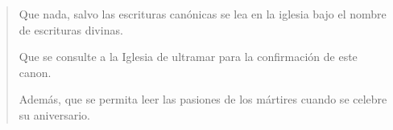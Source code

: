 \begin{quotation}
Que nada, salvo las escrituras canónicas se lea en la iglesia bajo el nombre de escrituras divinas.

Que se consulte a la Iglesia de ultramar para la confirmación de este canon.

Además, que se permita leer las pasiones de los mártires cuando se celebre su aniversario.
\end{quotation}
